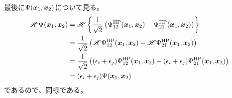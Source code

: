 最後に$\Psi({\bm{x}}_1,{\bm{x}}_2)$について見る。
\begin{align}
	\mathscr{H} \Psi(\x_1,\x_2)
&=
	\mathscr{H}\left\{
		\frac{1}{\sqrt{2}}
			\left(
				\Psi^{\rm HP}_{12}(\x_1,\x_2)
				-
				\Psi^{\rm HP}_{21}(\x_1,\x_2)
			\right)
	\right\} \\
%
%
&=
	\frac{1}{\sqrt{2}}
		\left(
			\mathscr{H} \Psi^{\rm HP}_{12}(\x_1,\x_2)
			-
			\mathscr{H} \Psi^{\rm HP}_{21}(\x_1,\x_2)
		\right) \\
%
%
&=
	\frac{1}{\sqrt{2}}
		\left(
			(\epsilon_i+\epsilon_j) \Psi^{\rm HP}_{12}(\x_1,\x_2)
			-
			(\epsilon_i+\epsilon_j) \Psi^{\rm HP}_{21}(\x_1,\x_2)
		\right) \\
%
%
&=
	(\epsilon_i+\epsilon_j) \Psi(\x_1,\x_2)
\end{align}
であるので、同様である。


